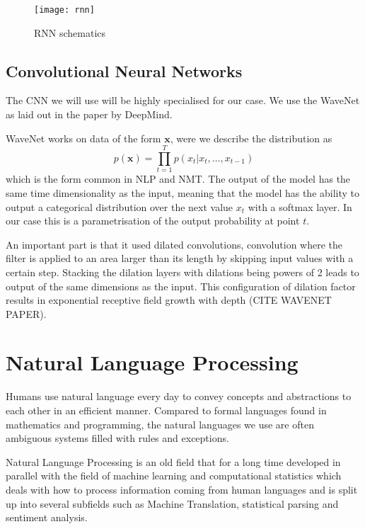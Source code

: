 \begin{figure}[h]
  \centering
  \texttt{[image: rnn]}
  \caption{RNN schematics}
  \label{fig:rolled_rnn}
\end{figure}

\subsection{Convolutional Neural Networks}

The CNN we will use will be highly specialised for our case. We use the WaveNet
as laid out in the paper by DeepMind.

WaveNet works on data of the form $\bm{x}$, were we describe the distribution as
\begin{equation}
p(\bm{x}) = \prod_{t=1}^T p(x_t| x_t, \dots, x_{t-1})
\end{equation}
which is the form common in NLP and NMT. The output of the model has the same
time dimensionality as the input, meaning that the model has the ability to
output a categorical distribution over the next value $x_t$ with a softmax
layer. In our case this is a parametrisation of the output probability at point $t$.

An important part is that it used dilated convolutions, convolution where the filter
is applied to an area larger than its length by skipping input values with a certain
step. Stacking the dilation layers with dilations being powers of 2 leads to output
of the same dimensions as the input. This configuration of dilation factor results
in exponential receptive field growth with depth (CITE WAVENET PAPER).

\section{Natural Language Processing}

Humans use natural language every day to convey concepts and abstractions to each
other in an efficient manner. Compared to formal languages found in
mathematics and programming, the natural languages we use are often
ambiguous systems filled with rules and exceptions\cite{Rosenfeld00twodecades, sep-computational-linguistics}.

Natural Language Processing is an old field that for a long
time developed in parallel with the field of machine learning and
computational statistics which deals with how to process information coming from
human languages and is split up into several subfields such as Machine
Translation, statistical parsing and sentiment analysis\cite{sep-computational-linguistics}.

